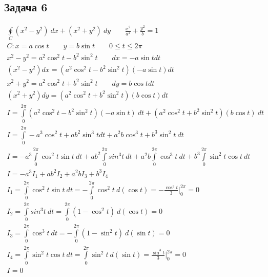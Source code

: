 \documentclass[a4paper,fleqn,12pt]{article}
\theoremstyle{definition}
\begin{document}
\subsection*{Задача 6}
\begin{gather*}
\oint\limits_C (x^2-y^2) \ dx + (x^2+y^2) \ dy \qquad \frac{x^2}{a^2} + \frac{y^2}{b} = 1\\
C: x =a\cos t \qquad y = b\sin t \qquad  0\leq t \leq 2\pi \\
x^2-y^2 = a^2 \cos^2 t - b^2\sin^2 t \qquad dx = -a\sin t dt \\
(x^2 - y^2) dx = (a^2 \cos^2 t - b^2\sin^2 t)(-a\sin t) dt \\
x^2+y^2 = a^2 \cos^2 t +  b^2\sin^2 t \qquad dy = b\cos t dt \\
(x^2 + y^2) dy = (a^2 \cos^2 t + b^2\sin^2 t)(b\cos t) dt \\
I = \int\limits_0 ^{2\pi} (a^2 \cos^2 t - b^2\sin^2 t)(-a\sin t) \ dt + (a^2 \cos^2 t + b^2\sin^2 t)(b\cos t) \ dt \\
I = \int\limits_0 ^{2\pi} -a^3 \cos^2 t +ab^2\sin^3 t dt + a^2b \cos^3 t + b^3\sin^2 t \ dt \\
I = -a^3 \int\limits_0 ^{2\pi} \cos^2 t \sin t \ dt + 
ab^2 \int\limits_0 ^{2\pi} sin^3 t \ dt + 
a^2b \int\limits_0 ^{2\pi} \cos^3 t \ dt + 
b^3 \int\limits_0 ^{2\pi} \sin^2 t \cos t \ dt \\
I = -a^3 I_1 + ab^2 I_2 +a^2 b I_3 + b^3 I_4 \\
I_1 = \int\limits_0 ^{2\pi} \cos^2 t \sin t \ dt = 
- \int\limits_0 ^{2\pi} \cos^2 t \ d(\cos t) = -\frac{\cos^3 t}{3} \Big|_0 ^{2\pi} = 0 \\
I_2 = \int\limits_0 ^{2\pi} sin^3 t \ dt = \int\limits_0 ^{2\pi} (1-\cos^2 t) \ d(\cos t) = 0 \\
I_3 = \int\limits_0 ^{2\pi} \cos^3 t \ dt  = - \int\limits_0 ^{2\pi} (1- \sin^2 t) \ d(\sin t) = 0 \\
I_4 =  \int\limits_0 ^{2\pi} \sin^2 t \cos t \ dt =  \int\limits_0 ^{2\pi} \sin^2 t  \ d(\sin t) = \frac{\sin^3 t}{3} \Big|_0 ^{2\pi} = 0 \\
I = 0
\end{gather*}
\end{document}
